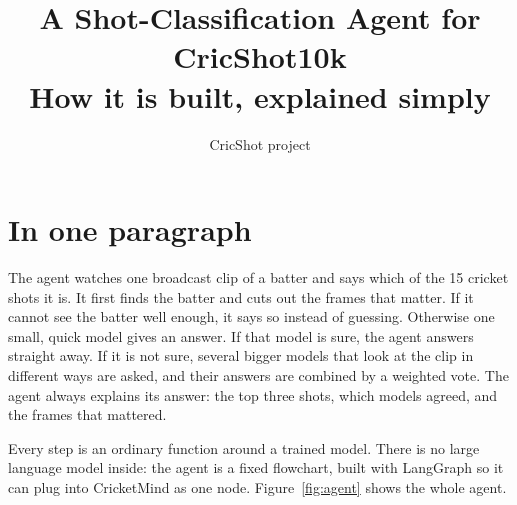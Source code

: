 \documentclass[11pt,a4paper]{article}
\title{\textbf{A Shot-Classification Agent for CricShot10k}\\[2pt]
  \large How it is built, explained simply}
\author{CricShot project}
\date{}
\begin{document}
\maketitle
\vspace{-6ex}

\section*{In one paragraph}

The agent watches one broadcast clip of a batter and says which of the 15
cricket shots it is. It first finds the batter and cuts out the frames
that matter. If it cannot see the batter well enough, it says so instead of
guessing. Otherwise one small, quick model gives an answer. If that model
is sure, the agent answers straight away. If it is not sure, several
bigger models that look at the clip in different ways are asked, and
their answers are combined by a weighted vote. The agent always explains
its answer: the top three shots, which models agreed, and the frames that
mattered.

Every step is an ordinary function around a trained model. There is no
large language model inside: the agent is a fixed flowchart, built with
LangGraph so it can plug into CricketMind as one node.
Figure~\ref{fig:agent} shows the whole agent.
\end{document}
